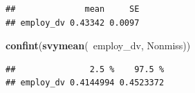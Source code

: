 \documentclass[]{article}
\newenvironment{Shaded}{\begin{snugshade}}{\end{snugshade}}
\newcommand{\KeywordTok}[1]{\textcolor[rgb]{0.13,0.29,0.53}{\textbf{{#1}}}}
\newcommand{\CommentTok}[1]{\textcolor[rgb]{0.56,0.35,0.01}{\textit{{#1}}}}
\newcommand{\NormalTok}[1]{{#1}}
\begin{document}
\begin{verbatim}
##              mean     SE
## employ_dv 0.43342 0.0097
\end{verbatim}

\begin{Shaded}
\begin{Highlighting}[]
\KeywordTok{confint}\NormalTok{(}\KeywordTok{svymean}\NormalTok{(~employ_dv, Nonmiss))}
\end{Highlighting}
\end{Shaded}

\begin{verbatim}
##               2.5 %    97.5 %
## employ_dv 0.4144994 0.4523372
\end{verbatim}

\begin{Shaded}
\end{Shaded}
\end{document}
